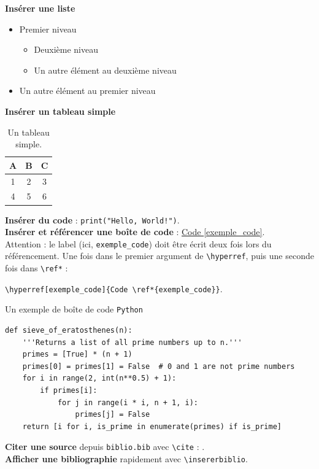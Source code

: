 \documentclass{rapportECL2024}
\begin{document}
\textbf{Insérer une liste}
\begin{itemize}
    \item Premier niveau
    \begin{itemize}
        \item Deuxième niveau
        \item Un autre élément au deuxième niveau
    \end{itemize}
    \item Un autre élément au premier niveau\\
\end{itemize}


\textbf{Insérer un tableau simple} \\
\begin{table}[H]
    \centering
    \begin{tabular}{|c|c|c|}
        \hline
        A & B & C \\
        \hline
        1 & 2 & 3 \\
        4 & 5 & 6 \\
        \hline
    \end{tabular}
    \caption{Un tableau simple.}
    \label{tab:tableau_simple}
\end{table}


\textbf{Insérer du code} : \texttt{print("Hello, World!")}.\\


\textbf{Insérer et référencer une boîte de code} : 
\hyperref[exemple_code]{Code \ref*{exemple_code}}.\\
Attention : le label (ici, \texttt{exemple\_code}) doit être écrit deux fois lors du référencement. Une fois dans le premier argument de \texttt{\textbackslash hyperref}, puis une seconde fois dans \texttt{\textbackslash ref*} :

\begin{center}
\texttt{\textbackslash hyperref[exemple\_code]\{Code \textbackslash ref*\{exemple\_code\}\}}.
\end{center}

\begin{codebox}{Un exemple de boîte de code \texttt{Python}}
\begin{verbatim}
def sieve_of_eratosthenes(n):
    '''Returns a list of all prime numbers up to n.'''
    primes = [True] * (n + 1)
    primes[0] = primes[1] = False  # 0 and 1 are not prime numbers
    for i in range(2, int(n**0.5) + 1):
        if primes[i]:
            for j in range(i * i, n + 1, i):
                primes[j] = False
    return [i for i, is_prime in enumerate(primes) if is_prime]
\end{verbatim}
\end{codebox}


\textbf{Citer une source} depuis \texttt{biblio.bib} avec \texttt{\textbackslash cite} : \cite{exemple_de_source}.\\


\textbf{Afficher une bibliographie} rapidement avec \texttt{\textbackslash insererbiblio}.

\insererbiblio 
\end{document}
